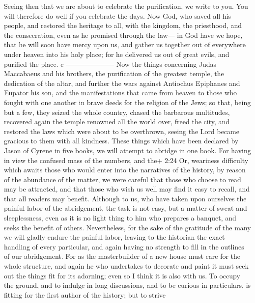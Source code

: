  Seeing then that we are about to celebrate the
purification, we write to you. You will therefore do well if you
celebrate the days.  Now God, who saved all his people, and
restored the heritage to all, with the kingdom, the priesthood, and the
consecration,  even as he promised through the law--- in
God have we hope, that he will soon have mercy upon us, and gather us
together out of everywhere under heaven into his holy place; for he
delivered us out of great evils, and purified the place. c
---------------------  Now the things concerning Judas
Maccabaeus and his brothers, the purification of the greatest temple,
the dedication of the altar,  and further the wars against
Antiochus Epiphanes and Eupator his son,  and the
manifestations that came from heaven to those who fought with one
another in brave deeds for the religion of the Jews; so that, being but
a few, they seized the whole country, chased the barbarous multitudes,
 recovered again the temple renowned all the world over,
freed the city, and restored the laws which were about to be overthrown,
seeing the Lord became gracious to them with all kindness. 
These things which have been declared by Jason of Cyrene in five books,
we will attempt to abridge in one book.  For having in view
the confused mass of the numbers, and the+ 2:24 Or, weariness difficulty
which awaits those who would enter into the narratives of the history,
by reason of the abundance of the matter,  we were careful
that those who choose to read may be attracted, and that those who wish
us well may find it easy to recall, and that all readers may benefit.
 Although to us, who have taken upon ourselves the painful
labor of the abridgement, the task is not easy, but a matter of sweat
and sleeplessness,  even as it is no light thing to him who
prepares a banquet, and seeks the benefit of others. Nevertheless, for
the sake of the gratitude of the many we will gladly endure the painful
labor,  leaving to the historian the exact handling of
every particular, and again having no strength to fill in the outlines
of our abridgement.  For as the masterbuilder of a new
house must care for the whole structure, and again he who undertakes to
decorate and paint it must seek out the things fit for its adorning;
even so I think it is also with us.  To occupy the ground,
and to indulge in long discussions, and to be curious in particulars, is
fitting for the first author of the history;  but to strive
